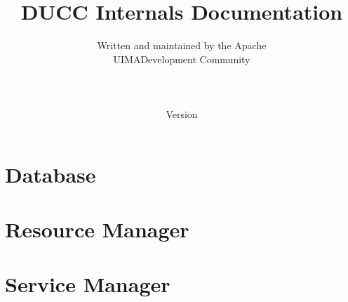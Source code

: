 \documentclass[oneside]{book}
\title{\Huge \textbf{DUCC Internals Documentation}}
\author{Written and maintained by the Apache\\
UIMA\texttrademark Development Community \\
\\
\\
\\
Version \versionnumber}
\date{}
\begin{document}
\frontmatter
\maketitle



\renewcommand\contentsname{Table of Contents}
\tableofcontents
\listoffigures

\mainmatter



\chapter{Database}


\chapter{Resource Manager}


\chapter{Service Manager}

\end{document}
